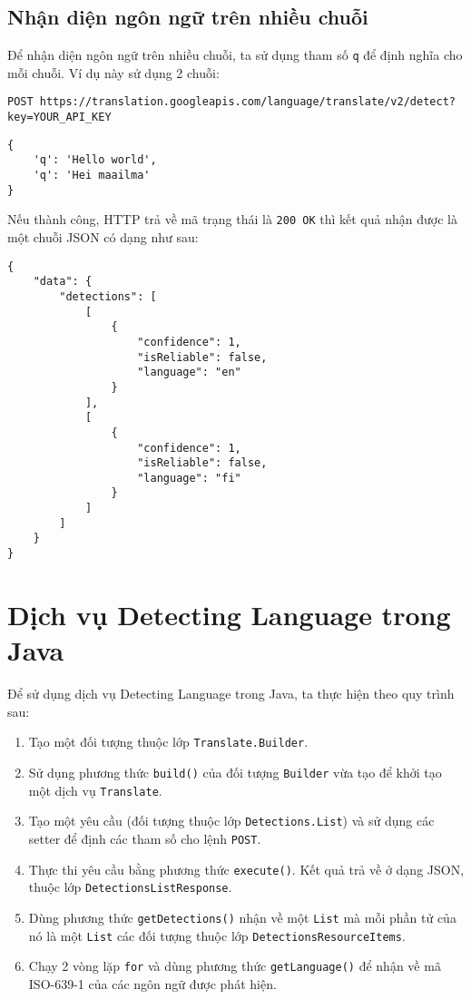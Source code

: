 \documentclass[../thesis.tex]{subfiles}
\begin{document}
\subsection{Nhận diện ngôn ngữ trên nhiều chuỗi}
Để nhận diện ngôn ngữ trên nhiều chuỗi, ta sử dụng tham số \lstinline{q} để định nghĩa cho mỗi chuỗi. Ví dụ này sử dụng 2 chuỗi:
\begin{lstlisting}[style=link]
POST https://translation.googleapis.com/language/translate/v2/detect?key=YOUR_API_KEY
\end{lstlisting}
\begin{lstlisting}[style=link]
{
	'q': 'Hello world',
	'q': 'Hei maailma'
}
\end{lstlisting}

Nếu thành công, HTTP trả về mã trạng thái là \lstinline{200 OK} thì kết quả nhận được là một chuỗi JSON có dạng như sau:

\begin{lstlisting}[style=link]
{
	"data": {
		"detections": [
			[
				{
					"confidence": 1,
					"isReliable": false,
					"language": "en"
				}
			],
			[
				{
					"confidence": 1,
					"isReliable": false,
					"language": "fi"
				}
			]
		]
	}
}
\end{lstlisting}

\section{Dịch vụ Detecting Language trong Java}
Để sử dụng dịch vụ Detecting Language trong Java, ta thực hiện theo quy trình sau:
\begin{enumerate}
	\item Tạo một đối tượng thuộc lớp \lstinline{Translate.Builder}.
  	\item Sử dụng phương thức \lstinline{build()} của đối tượng \lstinline{Builder} vừa tạo để khởi tạo một dịch vụ \lstinline{Translate}.
  	\item Tạo một yêu cầu (đối tượng thuộc lớp \lstinline{Detections.List}) và sử dụng các setter để định các tham số cho lệnh \lstinline{POST}.
  	\item Thực thi yêu cầu bằng phương thức \lstinline{execute()}. Kết quả trả về ở dạng JSON, thuộc lớp \lstinline{DetectionsListResponse}.
  	\item Dùng phương thức \lstinline{getDetections()} nhận về một \lstinline{List} mà mỗi phần tử của nó là một \lstinline{List} các đối tượng thuộc lớp \lstinline{DetectionsResourceItems}.
  	\item Chạy 2 vòng lặp \lstinline{for} và dùng phương thức \lstinline{getLanguage()} để nhận về mã ISO-639-1 của các ngôn ngữ được phát hiện.
\end{enumerate}


\end{document}
